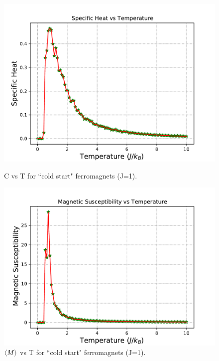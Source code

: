 \documentclass[12pt]{article}
\begin{document}
	\begin{figure}[H]
		\begin{minipage}[t]{0.5\textwidth}
			\centering
			\includegraphics[scale=0.5]{C vs T (J=1).pdf}
			\setcaptionwidth{3in}
			\caption{C vs T for ``cold start"  ferromagnets (J=1). }
			\label{fig: cold start specific heat}
		\end{minipage}
		\begin{minipage}[t]{0.5\textwidth}
			\centering
			\includegraphics[scale=0.5]{X vs T (J=1).pdf}
			\setcaptionwidth{3in}
			\caption{$\braket{M}$ vs T for ``cold start" ferromagnets (J=1).}
			\label{fig: cold start suspecibility}
		\end{minipage}
	\end{figure}
	
\end{document}
